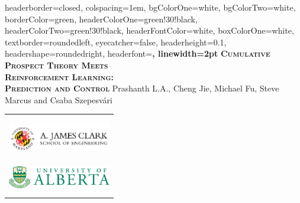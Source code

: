 \documentclass[portrait,a0paper,fontscale=0.285]{baposter} %
\begin{document}
\begin{poster}
{
headerborder=closed, %
colspacing=1em, %
bgColorOne=white, %
bgColorTwo=white, %
borderColor=green, %
headerColorOne=green!30!black, %
headerColorTwo=green!30!black, %
headerFontColor=white, %
boxColorOne=white, %
textborder=roundedleft, %
eyecatcher=false, %
headerheight=0.1\textheight, %
headershape=roundedright, %
headerfont=\Large\bf\textsc, %
linewidth=2pt %
}
%
{}
{\vspace{1ex}\bf\textsc{Cumulative Prospect Theory Meets \\[0.5ex]Reinforcement Learning:\\[0.5ex] Prediction and Control}\vspace{0.5em}} %
{ Prashanth L.A., Cheng Jie, Michael Fu, Steve Marcus and Csaba Szepesv\'ari } %
{
\begin{tabular}{c}
\includegraphics[width=4.5cm,height=1.8cm]{fig/clark.png} \\
\includegraphics[width=4.5cm,height=1.4cm]{fig/u-of-alberta-logo} 
\end{tabular}
} %




\end{poster}
\end{document}
